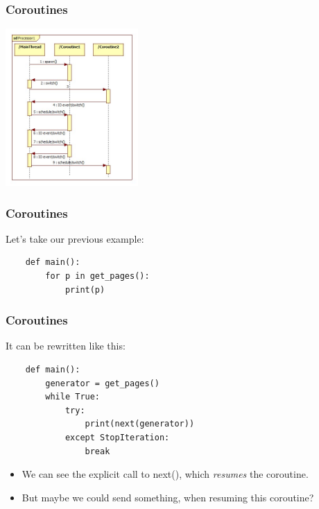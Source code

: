 \documentclass[ignorenonframetext,]{beamer}
\begin{document}
\begin{frame}[fragile]\frametitle{Coroutines}

\begin{center}
 \includegraphics[height=6cm]{img/coroutine_diagram}
\end{center}

\end{frame}

\begin{frame}[fragile]\frametitle{Coroutines}

Let's take our previous example:

\begin{verbatim}
    def main():
        for p in get_pages():
            print(p)
\end{verbatim}

\end{frame}

\begin{frame}[fragile]\frametitle{Coroutines}

It can be rewritten like this:

\begin{verbatim}
    def main():
        generator = get_pages()
        while True:
            try:
                print(next(generator))
            except StopIteration:
                break
\end{verbatim}

\begin{itemize}[<+->]
\itemsep1pt\parskip0pt
\item
  We can see the explicit call to next(), which \emph{resumes} the
  coroutine.
\item
  But maybe we could send something, when resuming this coroutine?
\end{itemize}

\end{frame}
\end{document}
